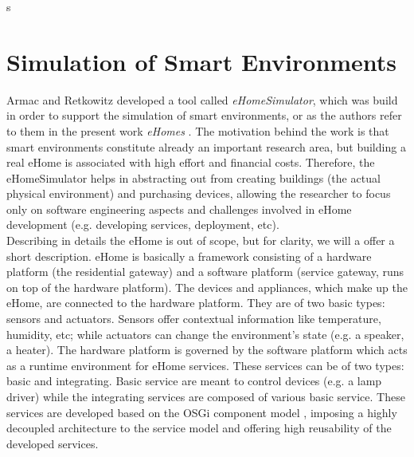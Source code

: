 s%
\section{Simulation of Smart Environments}\label{sec:sim_of_smart_envs}

Armac and Retkowitz developed a tool called \emph{eHomeSimulator}, which was build in order to support the simulation of smart environments, or as the authors refer to them in the present work \emph{eHomes} \cite{armac2007simulation}. The motivation behind the work is that smart environments constitute already an important research area, but building a real eHome is associated with high effort and financial costs. Therefore, the eHomeSimulator helps in abstracting out from creating buildings (the actual physical environment) and purchasing devices, allowing the researcher to focus only on software engineering aspects and challenges involved in eHome development (e.g. developing services, deployment, etc).\\

Describing in details the eHome is out of scope, but for clarity, we will a offer a short description. eHome is basically a framework consisting of a hardware platform (the residential gateway) and a software platform (service gateway, runs on top of the hardware platform). The devices and appliances, which make up the eHome, are connected to the hardware platform. They are of two basic types: sensors and actuators. Sensors offer contextual information like temperature, humidity, etc; while actuators can change the environment's state (e.g. a speaker, a heater). The hardware platform is governed by the software platform which acts as a runtime environment for eHome services. These services can be of two types: basic and integrating. Basic service are meant to control devices (e.g. a lamp driver) while the integrating services are composed of various basic service. These services are developed based on the OSGi component model \cite{allianceosgi}, imposing a highly decoupled architecture to the service model and offering high reusability of the developed services.\\

